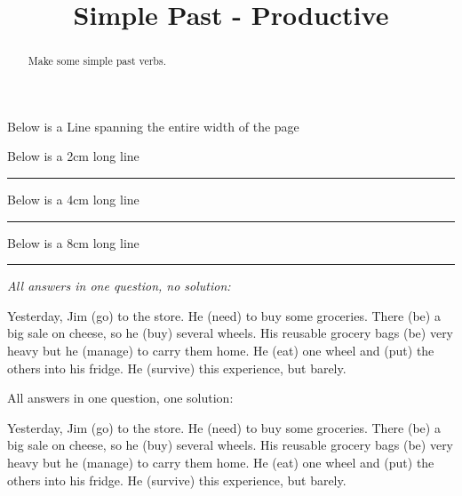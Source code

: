 \documentclass{ximera}
\title{Simple Past - Productive}
\begin{document}
\begin{abstract}
Make some simple past verbs.
\end{abstract}
\maketitle

Below is a Line spanning the entire width of the page

\noindent\makebox[\linewidth]{\rule{\paperwidth}{0.4pt}}

Below is a 2cm long line

\noindent\rule{2cm}{0.4pt}

Below is a 4cm long line

\noindent\rule{4cm}{0.4pt}

Below is a 8cm long line

\noindent\rule{8cm}{0.4pt}

\begin{question}

\textit{All answers in one question, no solution:}

Yesterday, Jim  (go) to the store. He  (need) to buy some groceries. There  (be) a big sale on cheese, so he  (buy) several wheels. His reusable grocery bags  (be) very heavy but he  (manage) to carry them home. He  (eat) one wheel and  (put) the others into his fridge. He  (survive) this experience, but barely.

\end{question}

\begin{question}
\begin{solution}

All answers in one question, one solution:

Yesterday, Jim  (go) to the store. He  (need) to buy some groceries. There  (be) a big sale on cheese, so he  (buy) several wheels. His reusable grocery bags  (be) very heavy but he  (manage) to carry them home. He  (eat) one wheel and  (put) the others into his fridge. He  (survive) this experience, but barely.

\end{solution}
\end{question}
\end{document}

